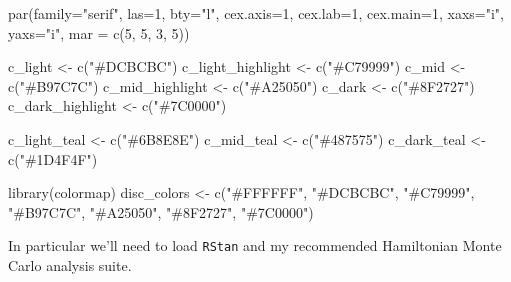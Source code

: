 \documentclass[
  letterpaper,
  DIV=11,
  numbers=noendperiod]{scrartcl}
\newenvironment{Shaded}{\begin{snugshade}}{\end{snugshade}}
\newcommand{\AttributeTok}[1]{\textcolor[rgb]{0.40,0.45,0.13}{#1}}
\newcommand{\DecValTok}[1]{\textcolor[rgb]{0.68,0.00,0.00}{#1}}
\newcommand{\FunctionTok}[1]{\textcolor[rgb]{0.28,0.35,0.67}{#1}}
\newcommand{\NormalTok}[1]{\textcolor[rgb]{0.00,0.23,0.31}{#1}}
\newcommand{\OtherTok}[1]{\textcolor[rgb]{0.00,0.23,0.31}{#1}}
\newcommand{\StringTok}[1]{\textcolor[rgb]{0.13,0.47,0.30}{#1}}
\begin{document}
\begin{Shaded}
\begin{Highlighting}[]
\FunctionTok{par}\NormalTok{(}\AttributeTok{family=}\StringTok{"serif"}\NormalTok{, }\AttributeTok{las=}\DecValTok{1}\NormalTok{, }\AttributeTok{bty=}\StringTok{"l"}\NormalTok{,}
    \AttributeTok{cex.axis=}\DecValTok{1}\NormalTok{, }\AttributeTok{cex.lab=}\DecValTok{1}\NormalTok{, }\AttributeTok{cex.main=}\DecValTok{1}\NormalTok{,}
    \AttributeTok{xaxs=}\StringTok{"i"}\NormalTok{, }\AttributeTok{yaxs=}\StringTok{"i"}\NormalTok{, }\AttributeTok{mar =} \FunctionTok{c}\NormalTok{(}\DecValTok{5}\NormalTok{, }\DecValTok{5}\NormalTok{, }\DecValTok{3}\NormalTok{, }\DecValTok{5}\NormalTok{))}

\NormalTok{c\_light }\OtherTok{\textless{}{-}} \FunctionTok{c}\NormalTok{(}\StringTok{"\#DCBCBC"}\NormalTok{)}
\NormalTok{c\_light\_highlight }\OtherTok{\textless{}{-}} \FunctionTok{c}\NormalTok{(}\StringTok{"\#C79999"}\NormalTok{)}
\NormalTok{c\_mid }\OtherTok{\textless{}{-}} \FunctionTok{c}\NormalTok{(}\StringTok{"\#B97C7C"}\NormalTok{)}
\NormalTok{c\_mid\_highlight }\OtherTok{\textless{}{-}} \FunctionTok{c}\NormalTok{(}\StringTok{"\#A25050"}\NormalTok{)}
\NormalTok{c\_dark }\OtherTok{\textless{}{-}} \FunctionTok{c}\NormalTok{(}\StringTok{"\#8F2727"}\NormalTok{)}
\NormalTok{c\_dark\_highlight }\OtherTok{\textless{}{-}} \FunctionTok{c}\NormalTok{(}\StringTok{"\#7C0000"}\NormalTok{)}

\NormalTok{c\_light\_teal }\OtherTok{\textless{}{-}} \FunctionTok{c}\NormalTok{(}\StringTok{"\#6B8E8E"}\NormalTok{)}
\NormalTok{c\_mid\_teal }\OtherTok{\textless{}{-}} \FunctionTok{c}\NormalTok{(}\StringTok{"\#487575"}\NormalTok{)}
\NormalTok{c\_dark\_teal }\OtherTok{\textless{}{-}} \FunctionTok{c}\NormalTok{(}\StringTok{"\#1D4F4F"}\NormalTok{)}

\FunctionTok{library}\NormalTok{(colormap)}
\NormalTok{disc\_colors }\OtherTok{\textless{}{-}} \FunctionTok{c}\NormalTok{(}\StringTok{"\#FFFFFF"}\NormalTok{, }\StringTok{"\#DCBCBC"}\NormalTok{, }\StringTok{"\#C79999"}\NormalTok{, }\StringTok{"\#B97C7C"}\NormalTok{,}
                 \StringTok{"\#A25050"}\NormalTok{, }\StringTok{"\#8F2727"}\NormalTok{, }\StringTok{"\#7C0000"}\NormalTok{)}
\end{Highlighting}
\end{Shaded}

In particular we'll need to load \texttt{RStan} and my recommended
Hamiltonian Monte Carlo analysis suite.
\end{document}
